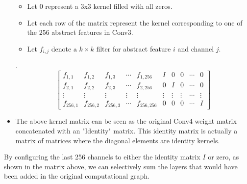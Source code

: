 \documentclass[12pt,a4paper,twoside,openright,bibliography=totocnumbered]{report}
\begin{document}
\begin{itemize}
		\begin{itemize}
			\item Let 0 represent a 3x3 kernel filled with all zeros.
			\item Let each row of the matrix represent the kernel corresponding to one of the 256 abstract features in Conv3.
			\item Let $f_{i,j}$ denote a $k \times k$ filter for abstract feature $i$ and channel $j$.
		\end{itemize} . 
		\[
			\begin{bmatrix}
					f_{1,1} & f_{1,2} & f_{1,3} & \cdots & f_{1,256} & I & 0 & 0 & \cdots & 0\\
					f_{2,1} & f_{2,2} & f_{2,3} & \cdots & f_{2,256} & 0 & I & 0 & \cdots & 0\\
					\vdots & \vdots & \vdots & \vdots & \vdots & \vdots & \vdots & \vdots & \cdots & \vdots \\
					f_{256,1} & f_{256,2} & f_{256,3} & \cdots & f_{256,256} & 0 & 0 & 0 & \cdots & I
			\end{bmatrix}
	\]
	\item The above kernel matrix can be seen as the original Conv4 weight matrix concatenated with an "Identity" matrix. This identity matrix is actually a matrix of matrices where the diagonal elements are identity kernels.
	\end{itemize}
	By configuring the last 256 channels to either the identity matrix  $I$ or zero, as shown in the matrix above, we can selectively sum the layers that would have been added in the original computational graph.





\end{document}
